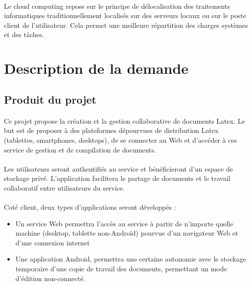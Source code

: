 \documentclass[a4paper,12pt]{article}
\begin{document}
\paragraph*{}
Le cloud computing repose sur le principe de délocalisation des traitements informatiques
 traditionnellement localisés sur des serveurs locaux ou sur le poste client de l'utilisateur. Cela 
permet une meilleure répartition des charges systèmes et des tâches.

\section{Description de la demande}

\subsection{Produit du projet}
 	
\paragraph*{} 
Ce projet propose la création et la gestion collaborative de documents
Latex. Le but est de proposer à des plateformes dépourvues de distribution
Latex (tablettes, smartphones, desktops), de se connecter au Web et
d’accéder à ces service de gestion et de compilation de documents.
\paragraph*{} 
Les utilisateurs seront authentifiés au service et bénéficieront d’un espace
de stockage privé. L’application facilitera le partage de documents et le
travail collaboratif entre utilisateurs du service.
\paragraph*{} 
Coté client, deux types d’applications seront développés :\\

\begin{itemize}
 \item Un service Web permettra l’accès au service à partir de n’importe
quelle machine (desktop, tablette non-Androïd) pourvue d’un navigateur
Web et d’une connexion internet

 \item Une application Android, permettra une certaine autonomie avec le
stockage temporaire d’une copie de travail des documents, permettant
un mode d’édition non-connecté.
\end{itemize}
\newpage
\end{document}
